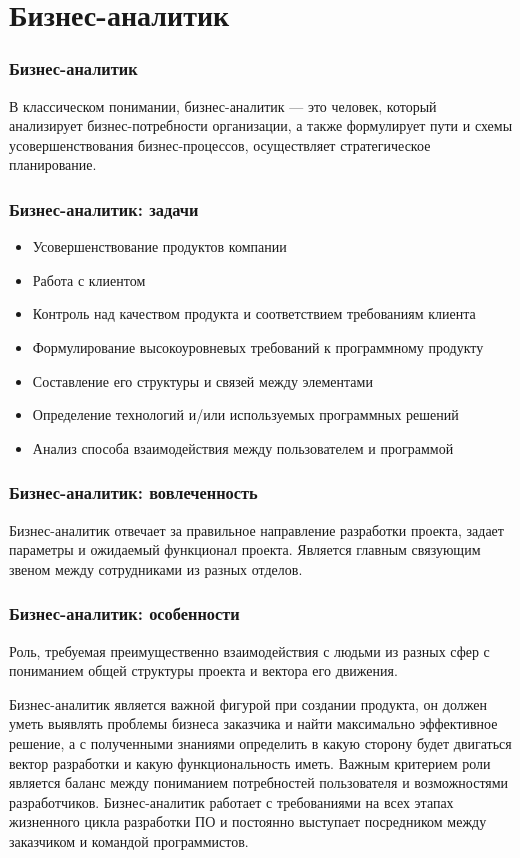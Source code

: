 \documentclass{../industrial-development}
\begin{document}
	\section{Бизнес-аналитик}
	
	\begin{frame} \frametitle{Бизнес-аналитик}
		\begin{block}{}
			\alert {}В классическом понимании, {бизнес-аналитик} — это человек, который анализирует бизнес-потребности организации, а также формулирует пути и схемы усовершенствования бизнес-процессов, осуществляет стратегическое планирование. 
		\end{block}
		
	\end{frame}
	
	\begin{frame} \frametitle{Бизнес-аналитик: задачи}
		\begin{itemize}
			\item Усовершенствование продуктов компании
			\item Работа с клиентом
			\item Контроль над качеством продукта и соответствием требованиям клиента
			\item Формулирование высокоуровневых требований к программному продукту
			\item Составление его структуры и связей между элементами
			\item Определение технологий и/или используемых программных решений
			\item Анализ способа взаимодействия между пользователем и программой
		\end{itemize}
	\end{frame}
	
	\begin{frame} \frametitle{Бизнес-аналитик: вовлеченность}
		Бизнес-аналитик отвечает за правильное направление разработки проекта, задает параметры и ожидаемый функционал проекта. Является главным связующим звеном между сотрудниками из разных отделов.
	\end{frame}
	
	\begin{frame} \frametitle{Бизнес-аналитик: особенности}
		Роль, требуемая преимущественно взаимодействия с людьми из разных сфер с пониманием общей структуры проекта и вектора его движения. 
	\end{frame}
	
	\lecturenotes
		 Бизнес-аналитик является важной фигурой при создании продукта, он должен уметь выявлять проблемы бизнеса заказчика и найти максимально эффективное решение, а с полученными знаниями определить в какую сторону будет двигаться вектор разработки и какую функциональность иметь. Важным критерием роли является баланс между пониманием потребностей пользователя и возможностями разработчиков. Бизнес-аналитик работает с требованиями на всех этапах жизненного цикла разработки ПО и постоянно выступает посредником между заказчиком и командой программистов. 
		 
\end{document}
